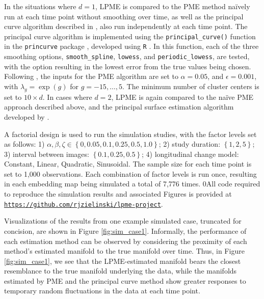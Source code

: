\documentclass[12pt]{article}
\newcommand{\blind}{0}
\theoremstyle{definition}
\begin{document}
In the situations where $d = 1$, LPME is compared to the PME method naïvely run at each time point without smoothing over time, as well as the principal curve algorithm described in \cite{hastiePrincipalCurves1989}, also run independently at each time point. The principal curve algorithm is implemented using the \texttt{principal\_curve()} function in the \texttt{princurve} package \citep{Cannoodt2018princurve}, developed using \texttt{R} \citep{rSoftware2023}. In this function, each of the three smoothing options, \texttt{smooth\_spline}, \texttt{lowess}, and \texttt{periodic\_lowess}, are tested, with the option resulting in the lowest error from the true values being chosen. Following \cite{mengPrincipalManifoldEstimation2021}, the inputs for the PME algorithm are set to $\alpha = 0.05$, and $\epsilon = 0.001$, with $\lambda_g = \exp(g)$ for $g = -15, \dots, 5$. The minimum number of cluster centers is set to $10 \times d$. In cases where $d = 2$, LPME is again compared to the naïve PME approach described above, and the principal surface estimation algorithm developed by \cite{yueParameterizationWhiteMatter2016}.

A factorial design is used to run the simulation studies, with the factor levels set as follows: 1) $\alpha, \beta, \zeta \in \left\{0, 0.05, 0.1, 0.25, 0.5, 1.0\right\}$; 2) study duration: $\left\{1, 2, 5\right\}$; 3) interval between images: $\left\{0.1, 0.25, 0.5\right\}$; 4) longitudinal change model: Constant, Linear, Quadratic, Sinusoidal. The sample size for each time point is set to 1,000 observations. Each combination of factor levels is run once, resulting in each embedding map being simulated a total of 7,776 times. \blind{All code required to reproduce the simulation results and associated Figures is provided at \href{https://github.com/rjzielinski/lpme-project}{\texttt{https://github.com/rjzielinski/lpme-project}}.}\fi

Visualizations of the results from one example simulated case, truncated for concision, are shown in Figure \ref{fig:sim_case1}. Informally, the performance of each estimation method can be observed by considering the proximity of each method's estimated manifold to the true manifold over time. Thus, in Figure \ref{fig:sim_case1}, we see that the LPME-estimated manifold bears the closest resemblance to the true manifold underlying the data, while the manifolds estimated by PME and the principal curve method show greater responses to temporary random fluctuations in the data at each time point.
\end{document}
